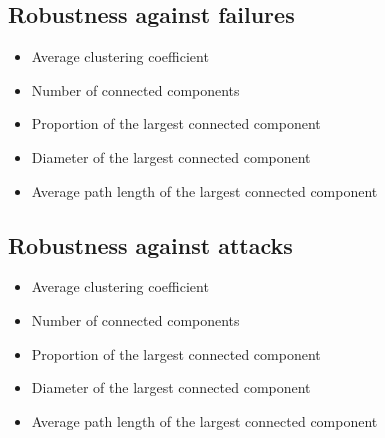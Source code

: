 \subsection{Robustness against failures}

\begin{itemize}
	\item Average clustering coefficient
	\item Number of connected components
	\item Proportion of the largest connected component
	\item Diameter of the largest connected component
	\item Average path length of the largest connected component
\end{itemize}

\subsection{Robustness against attacks}

\begin{itemize}
	\item Average clustering coefficient
	\item Number of connected components
	\item Proportion of the largest connected component
	\item Diameter of the largest connected component
	\item Average path length of the largest connected component
\end{itemize}